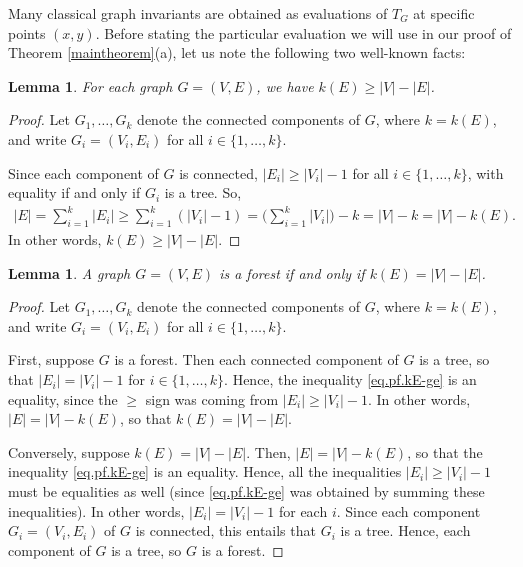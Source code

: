 \documentclass[12pt]{article}
\newtheorem{lemma}[theorem]{Lemma}
\theoremstyle{definition}
\theoremstyle{remark}
\begin{document}
Many classical graph invariants are obtained as evaluations of $T_G$ at specific points $(x,y)$. Before stating the particular evaluation we will use in our proof of Theorem \ref{maintheorem}(a), let us note the following two well-known facts:

\begin{lemma}\label{kE-ge}
    For each graph $G=(V,E)$, we have $k(E) \ge |V|-|E|$.
\end{lemma}

\begin{proof}
    Let $G_1,\ldots,G_k$ denote the connected components of $G$, where $k=k(E)$, and write $G_i = (V_i,E_i)$ for all $i \in \{1,\ldots,k\}$. 

	Since each component of $G$ is connected, $|E_i| \geq |V_i|-1$ for all $i \in \{1,\ldots,k\}$, with equality if and only if $G_i$ is a tree. So,
	\begin{align}
        |E| = \sum_{i=1}^k|E_i| \geq \sum_{i=1}^k(|V_i|-1) = \Big(\sum_{i=1}^k|V_i|\Big)-k = |V|-k = |V|-k(E).
		\label{eq.pf.kE-ge}
    \end{align}
	In other words, $k(E) \ge |V|-|E|$.
\end{proof}

\begin{lemma}\label{forest_iff}
    A graph $G=(V,E)$ is a forest if and only if $k(E) = |V|-|E|$.
\end{lemma}

\begin{proof}
    Let $G_1,\ldots,G_k$ denote the connected components of $G$, where $k=k(E)$, and write $G_i = (V_i,E_i)$ for all $i \in \{1,\ldots,k\}$. 

    First, suppose $G$ is a forest. Then each connected component of $G$ is a tree, so that $|E_i| = |V_i|-1$ for $i \in \{1,\ldots,k\}$.
	Hence, the inequality \eqref{eq.pf.kE-ge} is an equality, since the $\ge$ sign was coming from $|E_i| \ge |V_i|-1$.
	In other words, $|E| = |V| - k(E)$, so that $k(E) = |V|-|E|$.

    Conversely, suppose $k(E) = |V|-|E|$.
	Then, $|E| = |V| - k(E)$, so that the inequality \eqref{eq.pf.kE-ge} is an equality.
	Hence, all the inequalities $|E_i| \ge |V_i|-1$ must be equalities as well (since \eqref{eq.pf.kE-ge} was obtained by summing these inequalities).
	In other words, $|E_i| = |V_i|-1$ for each $i$.
	Since each component $G_i = (V_i, E_i)$ of $G$ is connected, this entails that $G_i$ is a tree.
	Hence, each component of $G$ is a tree, so $G$ is a forest.
\end{proof}
\end{document}
